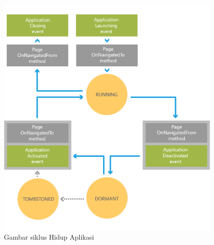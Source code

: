 \begin{figure}[h]
	\centering
		\includegraphics[scale=0.4]{Gambar/lifecycle_wp8}
	\caption{Gambar siklus Hidup Aplikasi\cite{MSDN}}
	\label{fig:Siklus Hidup Aplikasi}
\end{figure}


